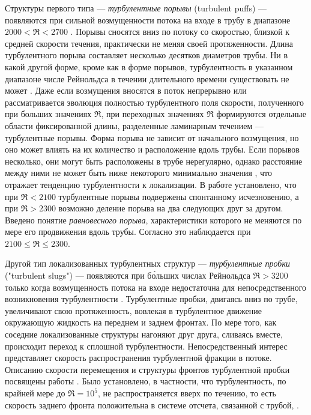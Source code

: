 Структуры первого типа --- {\it турбулентные порывы} (turbulent puffs) --- появляются при сильной возмущенности потока на входе в трубу в диапазоне $2000<\Re<2700$ \cite{Wygnanski1973}. Порывы сносятся вниз по потоку со скоростью, близкой к средней скорости течения, практически не меняя своей протяженности. Длина турбулентного порыва составляет несколько десятков диаметров трубы. Ни в какой другой форме, кроме как в форме порывов, турбулентность в указанном диапазоне числе Рейнольдса в течении длительного времени существовать не может \cite{vanDoorne2009, Moxey2010, Samanta2011}. Даже если возмущения вносятся в поток непрерывно или рассматривается эволюция полностью турбулентного поля скорости, полученного при больших значениях $\Re$, при переходных значениях $\Re$ формируются отдельные области фиксированной длины, разделенные ламинарным течением --- турбулентные порывы. Форма порыва не зависит от начального возмущения, но оно может влиять на их количество и расположение вдоль трубы. Если порывов несколько, они могут быть расположены в трубе нерегулярно, однако расстояние между ними не может быть ниже некоторого минимально значения \cite{Samanta2011}, что отражает тенденцию турбулентности к локализации. В работе \cite{Wygnanski1975} установлено, что при $\Re<2100$ турбулентные порывы подвержены спонтанному исчезновению, а при $\Re>2300$ возможно деление порыва на два следующих друг за другом. Введено понятие {\it равновесного порыва}, характеристики которого не меняются по мере его продвижения вдоль трубы. Согласно \cite{Wygnanski1975} это наблюдается при $2100\leqslant \Re \leqslant 2300$. 

Другой тип локализованных турбулентных структур --- {\it турбулентные пробки} ("turbulent slugs") --- появляются при б\'{о}льших числах Рейнольдса $\Re>3200$ только когда возмущенность потока на входе недостаточна для непосредственного возникновения турбулентности \cite{Wygnanski1973}. Турбулентные пробки, двигаясь вниз по трубе, увеличивают свою протяженность, вовлекая в турбулентное движение окружающую жидкость на переднем и заднем фронтах. По мере того, как соседние локализованные структуры нагоняют друг друга, сливаясь вместе, происходит переход к сплошной турбулентности. Непосредственный интерес представляет скорость распространения турбулентной фракции в потоке. Описанию скорости перемещения и структуры фронтов турбулентной пробки посвящены работы \cite{Lindgren1969, Wygnanski1973, Nishi2008, Duguet2010, Barkley2015}. Было установлено, в частности, что турбулентность, по крайней мере до $\Re = 10^5$, не распространяется вверх по течению, то есть скорость заднего фронта положительна в системе отсчета, связанной с трубой, \cite{Wygnanski1973}. 

